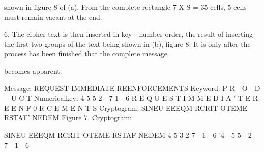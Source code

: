 shown in ﬁgure 8 of (a). From the complete rectangle 7 X S = 35 cells,
5 cells must remain vacant at the end.

6. The cipher text is then inserted in key—number order, the result of
inserting the ﬁrst two groups of the text being shown in (b), ﬁgure 8.
It is only after the process has been ﬁnished that the complete message

becomes apparent.

 

 

 

 

 

 

 

 

 

 

 

 

 

 

Message:
REQUEST IMMEDIATE REENFORCEMENTS
Keyword: P-R—O—D—U-C-T
Numericalkey: 4-5-5-2—7-1—6
R E Q U E S T
I M M E D I A '
T E R E E N F
0 R C E M E N
T S
Cryptogram:
SINEU EEEQM RCRIT OTEME RSTAF' NEDEM
Figure 7.
Cryptogram:

SINEU EEEQM RCRIT OTEME RSTAF NEDEM
4-5-3-2-7—1—6 '4—5-5—2—7—1—6

 

 

 

 

 

 

 

 

 

 

 

 

 

 

 

 

 

 

 

 

 

 

 

 

 

 

 

